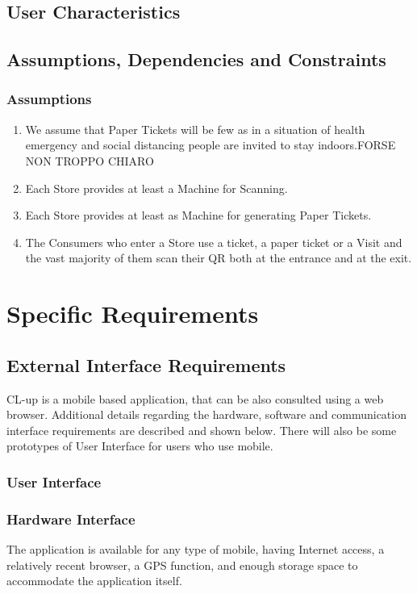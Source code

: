\documentclass[a4paper, 10pt, oneside]{article}
\newcommand*{\lorenzo}[1]{\textcolor{BurntOrange}{#1}}
\begin{document}
\subsection{User Characteristics}

\subsection{Assumptions, Dependencies and Constraints}
\subsubsection{Assumptions}
\begin{enumerate}[label={DA.\arabic{*}}]
    \item \label{dom:fewPaperTickets} 
We assume that Paper Tickets will be few as in a situation of health emergency and social distancing people are invited to stay indoors.\lorenzo{FORSE NON TROPPO CHIARO}
    \item \label{dom:machineScanning}Each Store provides at least a Machine for Scanning.
    \item \label{dom:machinePaperTicket}Each Store provides at least as Machine for generating Paper Tickets.
    \item \label{dom:consumerAccessStore}The Consumers who enter a Store use a ticket, a paper ticket or a Visit and the vast majority of them scan their QR both at the entrance and at the exit.
\end{enumerate}
\section{Specific Requirements}
\label{specificRequirements}
\subsection{External Interface Requirements}
CL-up is a mobile based application, that can be also consulted using a web browser. Additional details regarding the hardware, software and communication interface requirements are described and shown below. There will also be some prototypes of User Interface for users who use mobile.

\subsubsection{User Interface}

\subsubsection{Hardware Interface}
The application is available for any type of mobile, having Internet access, a relatively recent browser, a GPS function, and enough storage space to accommodate the application itself.
\end{document}

